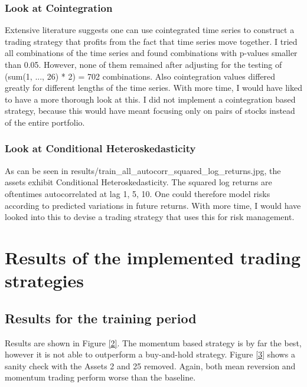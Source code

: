 \subsection{Look at Cointegration}
Extensive literature suggests one can use cointegrated time series to construct a trading strategy that profits from the fact that time series move together. I tried all combinations of the time series and found combinations with p-values smaller than 0.05. However, none of them remained after adjusting for the testing of (sum(1, ..., 26) * 2) = 702 combinations. Also cointegration values differed greatly for different lengths of the time series. With more time, I would have liked to have a more thorough look at this. I did not implement a cointegration based strategy, because this would have meant focusing only on pairs of stocks instead of the entire portfolio. 

\subsection{Look at Conditional Heteroskedasticity}
As can be seen in results\slash train\_all\_autocorr\_squared\_log\_returns.jpg, the assets exhibit Conditional Heteroskedasticity. The squared log returns are oftentimes autocorrelated at lag 1, 5, 10. One could therefore model risks according to predicted variations in future returns. With more time, I would have looked into this to devise a trading strategy that uses this for risk management. 



\chapter{Results of the implemented trading strategies}

\section{Results for the training period}
Results are shown in Figure \ref{2}. The momentum based strategy is by far the best, however it is not able to outperform a buy-and-hold strategy. Figure \ref{3} shows a sanity check with the Assets 2 and 25 removed. Again, both mean reversion and momentum trading perform worse than the baseline. 


